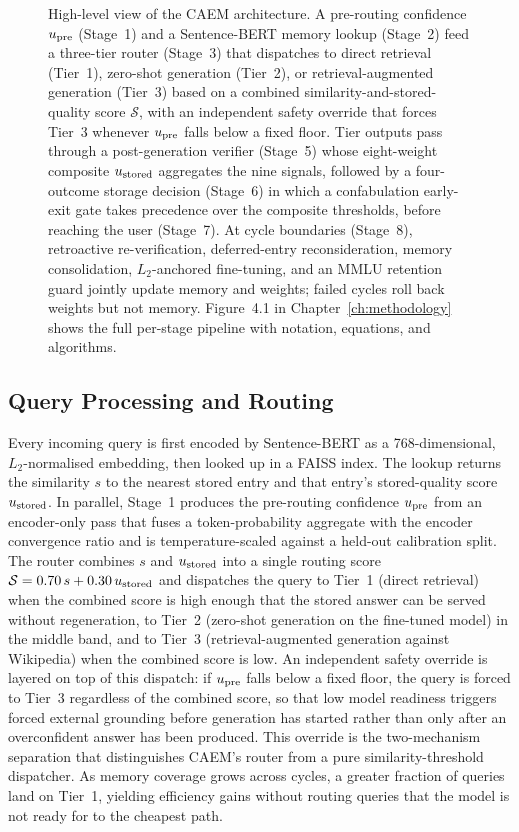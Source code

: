 \begin{figure}[p]
{{\begin{tikzpicture}
\end{tikzpicture}
}%
}

\vspace{0.3cm}

{\small\caption[CAEM Architecture (High-Level View)]{High-level view of the CAEM architecture. A pre-routing confidence $u_{\text{pre}}$ (Stage~1) and a Sentence-BERT memory lookup (Stage~2) feed a three-tier router (Stage~3) that dispatches to direct retrieval (Tier~1), zero-shot generation (Tier~2), or retrieval-augmented generation (Tier~3) based on a combined similarity-and-stored-quality score $\mathcal{S}$, with an independent safety override that forces Tier~3 whenever $u_{\text{pre}}$ falls below a fixed floor. Tier outputs pass through a post-generation verifier (Stage~5) whose eight-weight composite $u_{\text{stored}}$ aggregates the nine signals, followed by a four-outcome storage decision (Stage~6) in which a confabulation early-exit gate takes precedence over the composite thresholds, before reaching the user (Stage~7). At cycle boundaries (Stage~8), retroactive re-verification, deferred-entry reconsideration, memory consolidation, $L_{2}$-anchored fine-tuning, and an MMLU retention guard jointly update memory and weights; failed cycles roll back weights but not memory. Figure~4.1 in Chapter~\ref{ch:methodology} shows the full per-stage pipeline with notation, equations, and algorithms.}}
\label{fig:architecture}
\end{figure}

\subsection{Query Processing and Routing}

Every incoming query is first encoded by Sentence-BERT as a 768-dimensional, $L_2$-normalised embedding, then looked up in a FAISS index. The lookup returns the similarity $s$ to the nearest stored entry and that entry's stored-quality score $u_{\text{stored}}$. In parallel, Stage~1 produces the pre-routing confidence $u_{\text{pre}}$ from an encoder-only pass that fuses a token-probability aggregate with the encoder convergence ratio and is temperature-scaled against a held-out calibration split. The router combines $s$ and $u_{\text{stored}}$ into a single routing score $\mathcal{S} = 0.70\,s + 0.30\,u_{\text{stored}}$ and dispatches the query to Tier~1 (direct retrieval) when the combined score is high enough that the stored answer can be served without regeneration, to Tier~2 (zero-shot generation on the fine-tuned model) in the middle band, and to Tier~3 (retrieval-augmented generation against Wikipedia) when the combined score is low. An independent safety override is layered on top of this dispatch: if $u_{\text{pre}}$ falls below a fixed floor, the query is forced to Tier~3 regardless of the combined score, so that low model readiness triggers forced external grounding before generation has started rather than only after an overconfident answer has been produced. This override is the two-mechanism separation that distinguishes CAEM's router from a pure similarity-threshold dispatcher. As memory coverage grows across cycles, a greater fraction of queries land on Tier~1, yielding efficiency gains without routing queries that the model is not ready for to the cheapest path.

